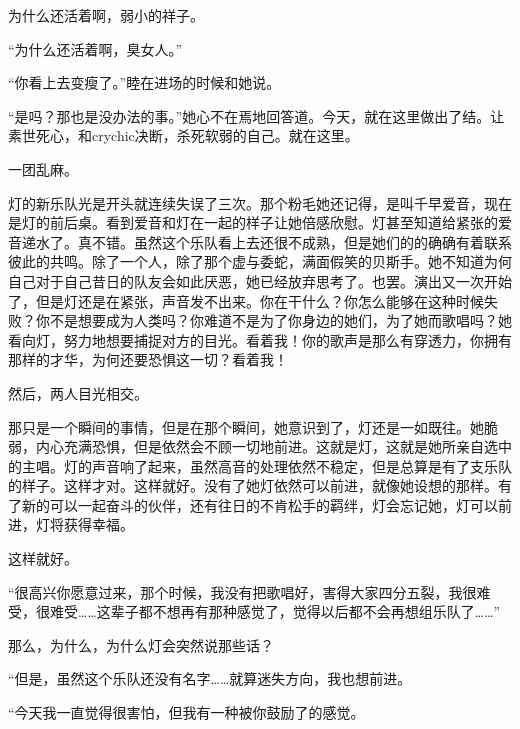 \documentclass{article}
\begin{document}
为什么还活着啊，弱小的祥子。



“为什么还活着啊，臭女人。”



\newpage



“你看上去变瘦了。”睦在进场的时候和她说。



“是吗？那也是没办法的事。”她心不在焉地回答道。今天，就在这里做出了结。让素世死心，和crychic决断，杀死软弱的自己。就在这里。



一团乱麻。



灯的新乐队光是开头就连续失误了三次。那个粉毛她还记得，是叫千早爱音，现在是灯的前后桌。看到爱音和灯在一起的样子让她倍感欣慰。灯甚至知道给紧张的爱音递水了。真不错。虽然这个乐队看上去还很不成熟，但是她们的的确确有着联系彼此的共鸣。除了一个人，除了那个虚与委蛇，满面假笑的贝斯手。她不知道为何自己对于自己昔日的队友会如此厌恶，她已经放弃思考了。也罢。演出又一次开始了，但是灯还是在紧张，声音发不出来。你在干什么？你怎么能够在这种时候失败？你不是想要成为人类吗？你难道不是为了你身边的她们，为了她而歌唱吗？她看向灯，努力地想要捕捉对方的目光。看着我！你的歌声是那么有穿透力，你拥有那样的才华，为何还要恐惧这一切？看着我！



然后，两人目光相交。



那只是一个瞬间的事情，但是在那个瞬间，她意识到了，灯还是一如既往。她脆弱，内心充满恐惧，但是依然会不顾一切地前进。这就是灯，这就是她所亲自选中的主唱。灯的声音响了起来，虽然高音的处理依然不稳定，但是总算是有了支乐队的样子。这样才对。这样就好。没有了她灯依然可以前进，就像她设想的那样。有了新的可以一起奋斗的伙伴，还有往日的不肯松手的羁绊，灯会忘记她，灯可以前进，灯将获得幸福。



这样就好。



“很高兴你愿意过来，那个时候，我没有把歌唱好，害得大家四分五裂，我很难受，很难受……这辈子都不想再有那种感觉了，觉得以后都不会再想组乐队了……”



那么，为什么，为什么灯会突然说那些话？



“但是，虽然这个乐队还没有名字……就算迷失方向，我也想前进。



“今天我一直觉得很害怕，但我有一种被你鼓励了的感觉。
\end{document}
